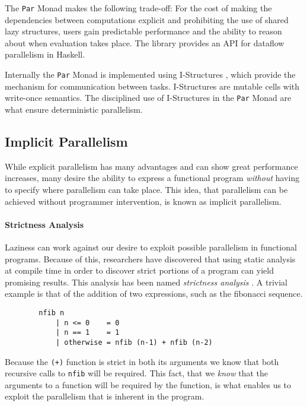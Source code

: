 The \verb|Par| Monad makes the following trade-off: For the cost of making the
dependencies between computations explicit and prohibiting the use of shared
lazy structures, users gain predictable performance and the ability to reason
about when evaluation takes place. The library provides an API for dataflow
parallelism in Haskell.

Internally the \verb|Par| Monad is implemented using I-Structures
\citep{Arvind:IStructures}, which provide the mechanism for communication
between tasks. I-Structures are mutable cells with write-once semantics.
The disciplined use of I-Structures in the \verb|Par| Monad are what ensure
deterministic parallelism.



 \subsection{Implicit Parallelism}
   While explicit parallelism has many advantages and can show great performance
increases, many desire the ability to express a functional program
\emph{without} having to specify where parallelism can take place. This idea,
that parallelism can be achieved without programmer intervention, is known as
implicit parallelism.

  \paragraph{Strictness Analysis}
    Laziness can work against our desire to exploit possible parallelism in
functional programs. Because of this, researchers have discovered that using
static analysis at compile time in order to discover strict portions of a
program can yield promising results. This analysis has been named
\emph{strictness analysis} \citep{ritabook, SPJ:PIFPL}. A trivial example is that
of the addition of two expressions, such as the fibonacci sequence.

\begin{verbatim}
        nfib n
            | n <= 0    = 0
            | n == 1    = 1
            | otherwise = nfib (n-1) + nfib (n-2)
\end{verbatim}

Because the \verb=(+)= function is strict in both its arguments we know that
both recursive calls to \verb=nfib= will be required. This fact, that we
\emph{know} that the arguments to a function will be required by the function,
is what enables us to exploit the parallelism that is inherent in the program.


